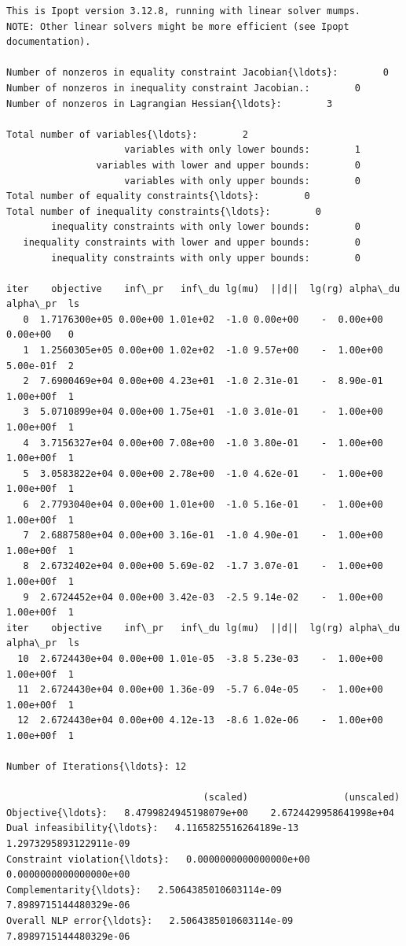 \documentclass[11pt]{article}
\begin{document}
    \begin{Verbatim}[commandchars=\\\{\}]
This is Ipopt version 3.12.8, running with linear solver mumps.
NOTE: Other linear solvers might be more efficient (see Ipopt documentation).

Number of nonzeros in equality constraint Jacobian{\ldots}:        0
Number of nonzeros in inequality constraint Jacobian.:        0
Number of nonzeros in Lagrangian Hessian{\ldots}:        3

Total number of variables{\ldots}:        2
                     variables with only lower bounds:        1
                variables with lower and upper bounds:        0
                     variables with only upper bounds:        0
Total number of equality constraints{\ldots}:        0
Total number of inequality constraints{\ldots}:        0
        inequality constraints with only lower bounds:        0
   inequality constraints with lower and upper bounds:        0
        inequality constraints with only upper bounds:        0

iter    objective    inf\_pr   inf\_du lg(mu)  ||d||  lg(rg) alpha\_du alpha\_pr  ls
   0  1.7176300e+05 0.00e+00 1.01e+02  -1.0 0.00e+00    -  0.00e+00 0.00e+00   0
   1  1.2560305e+05 0.00e+00 1.02e+02  -1.0 9.57e+00    -  1.00e+00 5.00e-01f  2
   2  7.6900469e+04 0.00e+00 4.23e+01  -1.0 2.31e-01    -  8.90e-01 1.00e+00f  1
   3  5.0710899e+04 0.00e+00 1.75e+01  -1.0 3.01e-01    -  1.00e+00 1.00e+00f  1
   4  3.7156327e+04 0.00e+00 7.08e+00  -1.0 3.80e-01    -  1.00e+00 1.00e+00f  1
   5  3.0583822e+04 0.00e+00 2.78e+00  -1.0 4.62e-01    -  1.00e+00 1.00e+00f  1
   6  2.7793040e+04 0.00e+00 1.01e+00  -1.0 5.16e-01    -  1.00e+00 1.00e+00f  1
   7  2.6887580e+04 0.00e+00 3.16e-01  -1.0 4.90e-01    -  1.00e+00 1.00e+00f  1
   8  2.6732402e+04 0.00e+00 5.69e-02  -1.7 3.07e-01    -  1.00e+00 1.00e+00f  1
   9  2.6724452e+04 0.00e+00 3.42e-03  -2.5 9.14e-02    -  1.00e+00 1.00e+00f  1
iter    objective    inf\_pr   inf\_du lg(mu)  ||d||  lg(rg) alpha\_du alpha\_pr  ls
  10  2.6724430e+04 0.00e+00 1.01e-05  -3.8 5.23e-03    -  1.00e+00 1.00e+00f  1
  11  2.6724430e+04 0.00e+00 1.36e-09  -5.7 6.04e-05    -  1.00e+00 1.00e+00f  1
  12  2.6724430e+04 0.00e+00 4.12e-13  -8.6 1.02e-06    -  1.00e+00 1.00e+00f  1

Number of Iterations{\ldots}: 12

                                   (scaled)                 (unscaled)
Objective{\ldots}:   8.4799824945198079e+00    2.6724429958641998e+04
Dual infeasibility{\ldots}:   4.1165825516264189e-13    1.2973295893122911e-09
Constraint violation{\ldots}:   0.0000000000000000e+00    0.0000000000000000e+00
Complementarity{\ldots}:   2.5064385010603114e-09    7.8989715144480329e-06
Overall NLP error{\ldots}:   2.5064385010603114e-09    7.8989715144480329e-06



\end{Verbatim}
\end{document}
